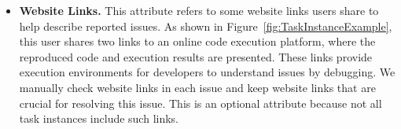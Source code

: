 \begin{itemize}[left=10pt]
    \item \textbf{Website Links.} This attribute refers to some website links users share to help describe reported issues. As shown in Figure~\ref{fig:TaskInstanceExample}, this user shares two links to an online code execution platform, where the reproduced code and execution results are presented. These links provide execution environments for developers to understand issues by debugging.  We manually check website links in each issue and keep website links that are crucial for resolving this issue. This is an optional attribute because not all task instances include such links. 

    

\end{itemize}
